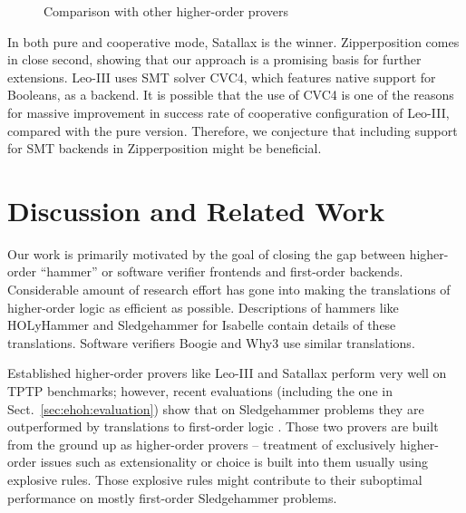 \begin{figure}[t]
  \label{fig:higher-order-provers}
  \begin{center}
    \def\arraystretch{1.1}%
    \caption{Comparison with other higher-order provers}
  \end{center}
\end{figure}

In both pure and cooperative mode, Satallax is the winner.
Zipperposition comes in close second, showing that our approach is a promising
basis for further extensions. Leo-III uses SMT solver CVC4, which features
native support for Booleans, as a backend. It is possible that the use of CVC4 is
one of the reasons for massive improvement in success rate of cooperative
configuration of Leo-III, compared with the pure version. Therefore, we conjecture
that including support for SMT backends in Zipperposition might be beneficial.\section{Discussion and Related Work} 
\label{sect:bool:discussion}

Our work is primarily motivated by the goal of closing the gap between
higher-order ``hammer'' or software verifier frontends and first-order backends.
Considerable amount of research effort has gone into making the translations of
higher-order logic as efficient as possible. Descriptions of hammers like
HOLyHammer \cite{ku-15-holyhammer} and Sledgehammer
\cite{pb-12-sh} for Isabelle contain details of these
translations. Software verifiers Boogie \cite{lr-10-boogie} and Why3
\cite{bfcp-11-why3} use similar translations.

Established higher-order provers like Leo-III and Satallax perform very
well on TPTP benchmarks; however, recent evaluations (including the one in Sect.~\ref{sec:ehoh:evaluation}) show that on Sledgehammer
problems they are outperformed by translations to first-order logic
\cite{bbtvw-21-sup-lam, %
cbetal-11-cvc4}. Those two provers are built from the ground up as
higher-order provers -- treatment of exclusively higher-order issues such as
extensionality or choice is built into them usually using explosive rules. Those
explosive rules might contribute to their suboptimal performance on mostly
first-order Sledgehammer problems.

